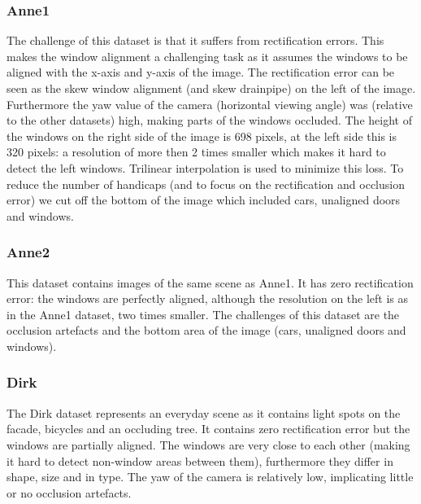 \subsubsection{Anne1}
The challenge of this dataset is that it suffers from rectification errors.
This makes the window alignment a challenging task as it assumes the windows to
be aligned with the x-axis and y-axis of the image.
The rectification error can be seen as the skew window alignment (and skew
drainpipe) on the left of the image. 
Furthermore the yaw value of the camera (horizontal viewing angle) was (relative
to the other datasets) high, making parts of the windows occluded.  The height
of the windows on the right side of the image is 698 pixels, at the left side this
is 320 pixels: a resolution of more then 2 times smaller which makes it hard to detect
the left windows. Trilinear interpolation is used to minimize this loss.
To reduce the number of handicaps (and to focus on the rectification and
occlusion error) we cut off the bottom of the image which included cars, unaligned doors and windows.
\clearpage

\subsubsection{Anne2}
This dataset contains images of the same scene as Anne1.
It has zero rectification error: the windows are perfectly aligned, although the
resolution on the left is as in the Anne1 dataset, two times smaller.
The challenges of this dataset are the occlusion artefacts and the 
bottom area of the image (cars, unaligned doors and windows).
\clearpage

\subsubsection{Dirk}
The Dirk dataset represents an everyday scene as it contains light spots on the facade,
bicycles and an occluding tree.  It contains zero rectification error but the
windows are partially aligned.  The windows are very close to each other (making it
hard to detect non-window areas between them), furthermore they differ in shape, size
and in type.  The yaw of the camera is relatively low, implicating little or no
occlusion artefacts.
\clearpage





